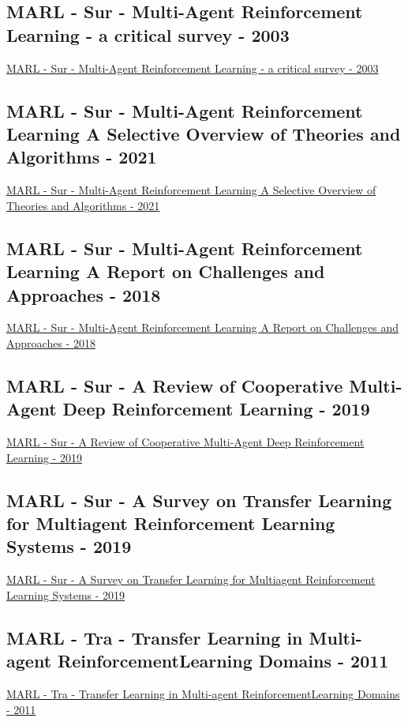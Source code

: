 \subsection{MARL - Sur - Multi-Agent Reinforcement Learning - a critical survey - 2003}
\href{http://ai.stanford.edu/people/shoham/www%20papers/MALearning_ACriticalSurvey_2003_0516.pdf}{MARL - Sur - Multi-Agent Reinforcement Learning - a critical survey - 2003}

\subsection{MARL - Sur - Multi-Agent Reinforcement Learning A Selective Overview of Theories and Algorithms - 2021}
\href{https://arxiv.org/abs/1911.10635}{MARL - Sur - Multi-Agent Reinforcement Learning A Selective Overview of Theories and Algorithms - 2021}

\subsection{MARL - Sur - Multi-Agent Reinforcement Learning A Report on Challenges and Approaches - 2018}
\href{https://arxiv.org/abs/1807.09427}{MARL - Sur - Multi-Agent Reinforcement Learning A Report on Challenges and Approaches - 2018}

\subsection{MARL - Sur - A Review of Cooperative Multi-Agent Deep Reinforcement Learning - 2019}
\href{https://arxiv.org/abs/1908.03963}{MARL - Sur - A Review of Cooperative Multi-Agent Deep Reinforcement Learning - 2019}

\subsection{MARL - Sur - A Survey on Transfer Learning for Multiagent Reinforcement Learning Systems  - 2019}
\href{https://www.jair.org/index.php/jair/article/view/11396}{MARL - Sur - A Survey on Transfer Learning for Multiagent Reinforcement Learning Systems  - 2019}

\subsection{MARL - Tra - Transfer Learning in Multi-agent ReinforcementLearning Domains - 2011}
\href{https://link.springer.com/chapter/10.1007/978-3-642-29946-9_25}{MARL - Tra - Transfer Learning in Multi-agent ReinforcementLearning Domains - 2011}

